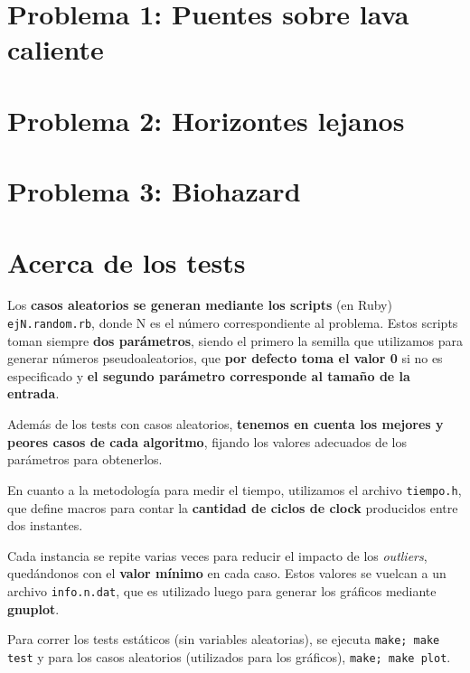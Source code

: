 \documentclass[a4paper]{article}
\begin{document}
\newpage

\section{Problema 1: Puentes sobre lava caliente}


\newpage

\section{Problema 2: Horizontes lejanos}


\newpage

\section{Problema 3: Biohazard}


\newpage

\section{Acerca de los tests}
Los \textbf{casos aleatorios se generan mediante los scripts} (en Ruby) \verb|ejN.random.rb|, donde 
N es el número correspondiente al problema. Estos scripts toman siempre \textbf{dos parámetros}, 
siendo el primero la semilla que utilizamos para generar números pseudoaleatorios, que 
\textbf{por defecto toma el valor 0} si no es especificado y \textbf{el segundo parámetro corresponde 
al tamaño de la entrada}. 

Además de los tests con casos aleatorios, \textbf{tenemos en cuenta los mejores y peores 
casos de cada algoritmo}, fijando los valores adecuados de los parámetros para 
obtenerlos.

En cuanto a la metodología para medir el tiempo, utilizamos el archivo \verb|tiempo.h|, 
que define macros para contar la \textbf{cantidad de ciclos de clock} producidos entre dos instantes. 

Cada instancia se repite varias veces para reducir el impacto de los \textit{outliers}, quedándonos 
con el \textbf{valor mínimo} en cada caso. Estos valores se vuelcan a un archivo \verb|info.n.dat|, que 
es utilizado luego para generar los gráficos mediante \textbf{gnuplot}.

Para correr los tests estáticos (sin variables aleatorias), se ejecuta \verb|make; make test| y para los 
casos aleatorios (utilizados para los gráficos), \verb|make; make plot|. 
\end{document}
